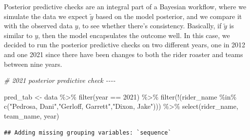 \documentclass[
]{article}
\newenvironment{Shaded}{\begin{snugshade}}{\end{snugshade}}
\newcommand{\CommentTok}[1]{\textcolor[rgb]{0.56,0.35,0.01}{\textit{#1}}}
\newcommand{\DecValTok}[1]{\textcolor[rgb]{0.00,0.00,0.81}{#1}}
\newcommand{\FunctionTok}[1]{\textcolor[rgb]{0.00,0.00,0.00}{#1}}
\newcommand{\NormalTok}[1]{#1}
\newcommand{\OtherTok}[1]{\textcolor[rgb]{0.56,0.35,0.01}{#1}}
\newcommand{\SpecialCharTok}[1]{\textcolor[rgb]{0.00,0.00,0.00}{#1}}
\newcommand{\StringTok}[1]{\textcolor[rgb]{0.31,0.60,0.02}{#1}}
\begin{document}
Posterior predictive checks are an integral part of a Bayesian workflow,
where we simulate the data we expect \(\tilde{y}\) based on the model
posterior, and we compare it with the observed data \(y\), to see
whether there's consistency. Basically, if \(\tilde y\) is similar to
\(y\), then the model encapsulates the outcome well. In this case, we
decided to run the posterior predictive checks on two different years,
one in 2012 and one 2021 since there have been changes to both the rider
roaster and teams between nine years.

\begin{Shaded}
\begin{Highlighting}[]
\CommentTok{\# 2021 posterior predictive check {-}{-}{-}{-}}

\NormalTok{pred\_tab }\OtherTok{\textless{}{-}}
\NormalTok{  data }\SpecialCharTok{\%\textgreater{}\%}
  \FunctionTok{filter}\NormalTok{(year }\SpecialCharTok{==} \DecValTok{2021}\NormalTok{) }\SpecialCharTok{\%\textgreater{}\%}
  \FunctionTok{filter}\NormalTok{(}\SpecialCharTok{!}\NormalTok{(rider\_name }\SpecialCharTok{\%in\%} \FunctionTok{c}\NormalTok{(}\StringTok{"Pedrosa, Dani"}\NormalTok{,}\StringTok{"Gerloff, Garrett"}\NormalTok{,}\StringTok{"Dixon, Jake"}\NormalTok{))) }\SpecialCharTok{\%\textgreater{}\%} 
  \FunctionTok{select}\NormalTok{(rider\_name, team\_name, year)}
\end{Highlighting}
\end{Shaded}

\begin{verbatim}
## Adding missing grouping variables: `sequence`
\end{verbatim}
\end{document}
